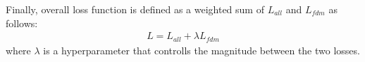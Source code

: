 Finally, overall loss function is defined as a weighted sum of $L_{all}$ and $L_{fdm}$ as follows:
\begin{equation}
\label{eq:overall}
\begin{aligned}
L = L_{all} + \lambda L_{fdm}
\end{aligned}
\end{equation}
where $\lambda$ is a hyperparameter that controlls the magnitude between the two losses.

